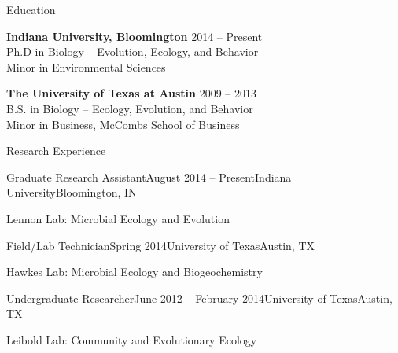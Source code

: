 \documentclass{resume} %
\begin{document}

\begin{rSection}{Education}

{\bf Indiana University, Bloomington} \hfill {2014 -- Present} \\
Ph.D in Biology -- Evolution, Ecology, and Behavior \\
Minor in Environmental Sciences

{\bf The University of Texas at Austin} \hfill {2009 -- 2013} \\
B.S. in Biology -- Ecology, Evolution, and Behavior \\
Minor in Business, McCombs School of Business \smallskip \\

\end{rSection}


\begin{rSection}{Research Experience}


\begin{rSubsection}{Graduate Research Assistant}{August 2014 -- Present}{Indiana University}{Bloomington, IN}
\item Lennon Lab: Microbial Ecology and Evolution
\end{rSubsection}

\begin{rSubsection}{Field/Lab Technician}{Spring 2014}{University of Texas}{Austin, TX}
\item Hawkes Lab: Microbial Ecology and Biogeochemistry
\end{rSubsection}

\begin{rSubsection}{Undergraduate Researcher}{June 2012 -- February 2014}{University of Texas}{Austin, TX}
\item Leibold Lab: Community and Evolutionary Ecology
\end{rSubsection}

\end{rSection}

\end{document}
